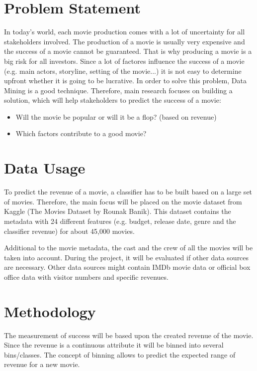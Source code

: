 

 
\section{Problem Statement}
 In today's world, each movie production comes with a lot of uncertainty for all stakeholders involved. The production of a movie is usually very expensive and the success of a movie cannot be guaranteed. That is why producing a movie is a big risk for all investors. 
Since a lot of factores influence the success of a movie (e.g. main actors, storyline, setting of the movie...) it is not easy to determine upfront whether it is going to be lucrative.
In order to solve this problem, Data Mining is a good technique. 
Therefore, main research focuses on building a solution, which will help stakeholders to predict the success of a movie:

\begin{itemize}
    \item Will the movie be popular or will it be a flop? (based on revenue)
    \item Which factors contribute to a good movie?
\end{itemize}


\section{Data Usage}
To predict the revenue of a movie, a classifier has to be built based on a large set of movies. Therefore, the main focus will be placed on the movie dataset from Kaggle (The Movies Dataset by Rounak Banik). This dataset contains the metadata with 24 different features (e.g. budget, release date, genre and the classifier revenue) for about 45,000 movies. 

Additional to the movie metadata, the cast and the crew of all the movies will be taken into account. During the project, it will be evaluated if other data sources are necessary. Other data sources might contain IMDb movie data or official box office data with visitor numbers and specific revenues.


\section{Methodology}

The measurement of success will be based upon the created revenue of the movie. Since the revenue is a continuous attribute it will be binned into several bins/classes. The concept of binning allows to predict the expected range of revenue for a new movie.

